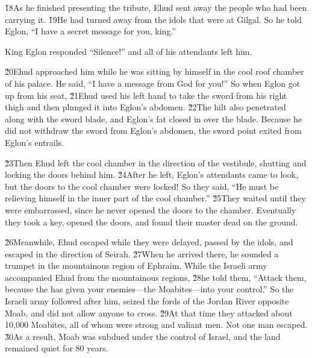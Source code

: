\v{18}As he finished presenting the tribute, Ehud sent away the people who had been carrying it. \v{19}He had turned away from the idols that were at Gilgal. So he told Eglon, ``I have a secret message for you, king.''

King Eglon responded ``Silence!'' and all of his attendants left him.

\v{20}Ehud approached him while he was sitting by himself in the cool roof chamber of his palace. He said, ``I have a message from God for you!'' So when Eglon got up from his seat, \v{21}Ehud used his left hand to take the sword from his right thigh and then plunged it into Eglon's abdomen. \v{22}The hilt also penetrated along with the sword blade, and Eglon's fat closed in over the blade. Because he did not withdraw the sword from Eglon's abdomen, the sword point exited from Eglon's entrails.

\v{23}Then Ehud left the cool chamber in the direction of the vestibule, shutting and locking the doors behind him. \v{24}After he left, Eglon's attendants came to look, but the doors to the cool chamber were locked! So they said, ``He must be relieving himself in the inner part of the cool chamber.'' \v{25}They waited until they were embarrassed, since he never opened the doors to the chamber. Eventually they took a key, opened the doors, and found their master dead on the ground.

\v{26}Meanwhile, Ehud escaped while they were delayed, passed by the idols, and escaped in the direction of Seirah. \v{27}When he arrived there, he sounded a trumpet in the mountainous region of Ephraim. While the Israeli army accompanied Ehud from the mountainous regions, \v{28}he told them, ``Attack them, because the  has given your enemies---the Moabites---into your control.'' So the Israeli army followed after him, seized the fords of the Jordan River opposite Moab, and did not allow anyone to cross. \v{29}At that time they attacked about 10,000 Moabites, all of whom were strong and valiant men. Not one man escaped. \v{30}As a result, Moab was subdued under the control of Israel, and the land remained quiet for 80 years.

